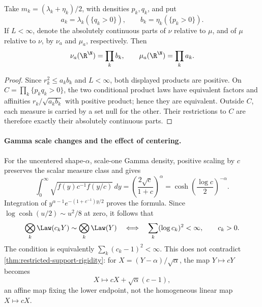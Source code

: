 \begin{corollary}
\label{cor:block-absolutely-continuous-masses}
Take \(m_k=(\lambda_k+\eta_k)/2\), with densities \(p_k,q_k\), and put
\[
 a_k=\lambda_k(\{q_k>0\}),\qquad
 b_k=\eta_k(\{p_k>0\}).
\]
If \(L<\infty\), denote the absolutely continuous parts of \(\nu\)
relative to \(\mu\), and of \(\mu\) relative to \(\nu\), by
\(\nu_a\) and \(\mu_a\), respectively.
Then
\begin{equation}
 \nu_a(\R^\N)=\prod_kb_k,\qquad
 \mu_a(\R^\N)=\prod_ka_k.
 \label{eq:restricted-common-masses}
\end{equation}
\end{corollary}
\begin{proof}
Since \(r_k^2\leq a_kb_k\) and \(L<\infty\), both displayed products are positive.
On \(C=\prod_k\{p_kq_k>0\}\), the two conditional product laws have
equivalent factors and affinities \(r_k/\sqrt{a_kb_k}\) with positive
product; hence they are equivalent.
Outside \(C\), each measure is carried by a set null for the other.
Their restrictions to \(C\) are therefore exactly their absolutely
continuous parts.
\end{proof}

\paragraph{Gamma scale changes and the effect of centering.}
For the uncentered shape-\(\alpha\), scale-one Gamma density, positive
scaling by \(c\) preserves the scalar measure class and gives
\begin{equation}
  \int_0^\infty\sqrt{f(y)c^{-1}f(y/c)}\,dy
 =\left(\frac{2\sqrt c}{1+c}\right)^\alpha
 =\cosh\!\left(\frac{\log c}{2}\right)^{-\alpha}.
 \label{eq:restricted-gamma-scale}
\end{equation}
Integration of \(y^{\alpha-1}e^{-(1+c^{-1})y/2}\) proves the formula.
Since \(\log\cosh(u/2)\sim u^2/8\) at zero, it follows that
\begin{equation}
 \bigotimes_k\Law(c_kY)\sim\bigotimes_k\Law(Y)
 \quad\Longleftrightarrow\quad
 \sum_k(\log c_k)^2<\infty,
 \qquad c_k>0.
 \label{eq:restricted-gamma-scale-product}
\end{equation}
The condition is equivalently \(\sum_k(c_k-1)^2<\infty\).
This does not contradict \cref{thm:restricted-support-rigidity}:
for \(X=(Y-\alpha)/\sqrt\alpha\), the map \(Y\mapsto cY\) becomes
\[
 X\longmapsto cX+\sqrt\alpha(c-1),
\]
an affine map fixing the lower endpoint, not the homogeneous
linear map \(X\mapsto cX\).

